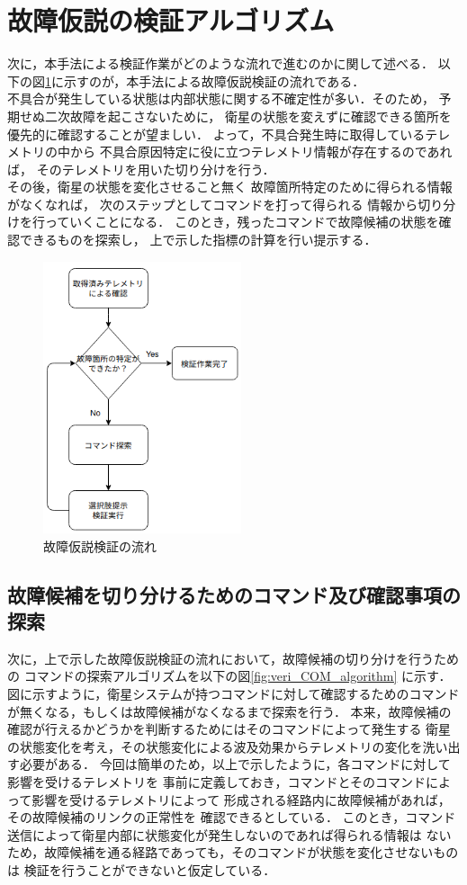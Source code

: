 \documentclass[11pt]{jsreport}
\begin{document}
\newpage
\section{故障仮説の検証アルゴリズム}
次に，本手法による検証作業がどのような流れで進むのかに関して述べる．
以下の図\ref{fig:whole_fault_flow}に示すのが，本手法による故障仮説検証の流れである．\\
不具合が発生している状態は内部状態に関する不確定性が多い．そのため，
予期せぬ二次故障を起こさないために，
衛星の状態を変えずに確認できる箇所を優先的に確認することが望ましい．
よって，不具合発生時に取得しているテレメトリの中から
不具合原因特定に役に立つテレメトリ情報が存在するのであれば，
そのテレメトリを用いた切り分けを行う．\\
その後，衛星の状態を変化させること無く
故障箇所特定のために得られる情報がなくなれば，
次のステップとしてコマンドを打って得られる
情報から切り分けを行っていくことになる．
このとき，残ったコマンドで故障候補の状態を確認できるものを探索し，
上で示した指標の計算を行い提示する．

\begin{figure}[H]
   \centering
      \includegraphics[height=8.0cm]{figure/whole_fault_diagnosis_flow.png}
      \caption{故障仮説検証の流れ}
      \label{fig:whole_fault_flow}
\end{figure}

\subsection{故障候補を切り分けるためのコマンド及び確認事項の探索}
次に，上で示した故障仮説検証の流れにおいて，故障候補の切り分けを行うための
コマンドの探索アルゴリズムを以下の図\ref{fig:veri_COM_algorithm}
に示す．
図に示すように，衛星システムが持つコマンドに対して確認するためのコマンド
が無くなる，もしくは故障候補がなくなるまで探索を行う．
本来，故障候補の確認が行えるかどうかを判断するためにはそのコマンドによって発生する
衛星の状態変化を考え，その状態変化による波及効果からテレメトリの変化を洗い出す必要がある．
今回は簡単のため，以上で示したように，各コマンドに対して影響を受けるテレメトリを
事前に定義しておき，コマンドとそのコマンドによって影響を受けるテレメトリによって
形成される経路内に故障候補があれば，その故障候補のリンクの正常性を
確認できるとしている．
このとき，コマンド送信によって衛星内部に状態変化が発生しないのであれば得られる情報は
ないため，故障候補を通る経路であっても，そのコマンドが状態を変化させないものは
検証を行うことができないと仮定している．
\end{document}
